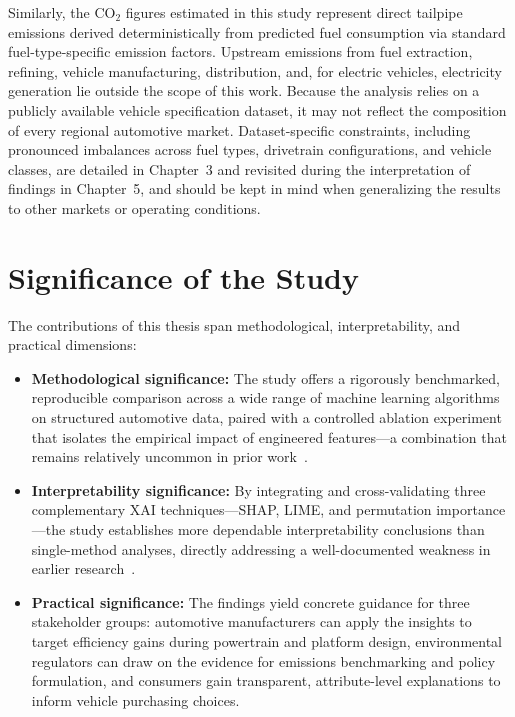 Similarly, the CO$_2$ figures estimated in this study represent direct tailpipe emissions derived deterministically from predicted fuel consumption via standard fuel-type-specific emission factors. Upstream emissions from fuel extraction, refining, vehicle manufacturing, distribution, and, for electric vehicles, electricity generation lie outside the scope of this work. Because the analysis relies on a publicly available vehicle specification dataset, it may not reflect the composition of every regional automotive market. Dataset-specific constraints, including pronounced imbalances across fuel types, drivetrain configurations, and vehicle classes, are detailed in Chapter~3 and revisited during the interpretation of findings in Chapter~5, and should be kept in mind when generalizing the results to other markets or operating conditions.

\section{Significance of the Study}

The contributions of this thesis span methodological, interpretability, and practical dimensions:

\begin{itemize}
    \item \textbf{Methodological significance:} The study offers a rigorously benchmarked, reproducible comparison across a wide range of machine learning algorithms on structured automotive data, paired with a controlled ablation experiment that isolates the empirical impact of engineered features---a combination that remains relatively uncommon in prior work~\cite{atique2026explainable}.

    \item \textbf{Interpretability significance:} By integrating and cross-validating three complementary XAI techniques---SHAP, LIME, and permutation importance---the study establishes more dependable interpretability conclusions than single-method analyses, directly addressing a well-documented weakness in earlier research~\cite{atique2026explainable}\cite{mangalathu2020failure}.

    \item \textbf{Practical significance:} The findings yield concrete guidance for three stakeholder groups: automotive manufacturers can apply the insights to target efficiency gains during powertrain and platform design, environmental regulators can draw on the evidence for emissions benchmarking and policy formulation, and consumers gain transparent, attribute-level explanations to inform vehicle purchasing choices.
\end{itemize}

